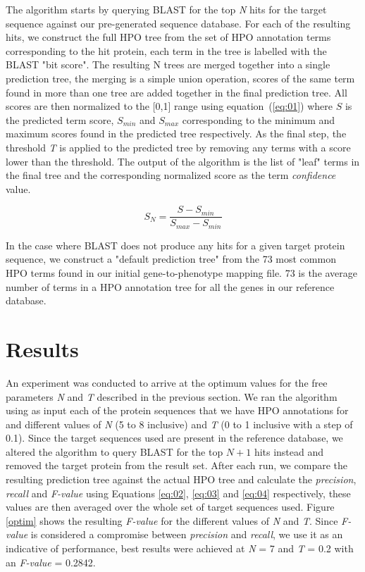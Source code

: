 \documentclass{bioinfo}
\begin{document}
The algorithm starts by querying BLAST for the top \textit{N} hits for the target sequence against our pre-generated sequence database. For each of the resulting hits, we construct the full HPO tree from the set of HPO annotation terms corresponding to the hit protein, each term in the tree is labelled with the BLAST "bit score". The resulting N trees are merged together into a single prediction tree, the merging is a simple union operation, scores of the same term found in more than one tree are added together in the final prediction tree. All scores are then normalized to the [0,1] range using equation~(\ref{eq:01}) where $S$ is the predicted term score, $S_{min}$ and $S_{max}$ corresponding to the minimum and maximum scores found in the predicted tree respectively. As the final step, the threshold \textit{T} is applied to the predicted tree by removing any terms with a score lower than the threshold. The output of the algorithm is the list of "leaf" terms in the final tree and the corresponding normalized score as the term \textit{confidence} value.

\begin{equation}
S_N = \frac{S - S_{min}}{S_{max} - S_{min}}
\label{eq:01}
\end{equation}

In the case where BLAST does not produce any hits for a given target protein sequence, we construct a "default prediction tree" from the 73 most common HPO terms found in our initial gene-to-phenotype mapping file. 73 is the average number of terms in a HPO annotation tree for all the genes in our reference database.

\section{Results}

An experiment was conducted to arrive at the optimum values for the free parameters \textit{N} and \textit{T} described in the previous section. We ran the algorithm using as input each of the protein sequences that we have HPO annotations for and different values of \textit{N} (5 to 8 inclusive) and \textit{T} (0 to 1 inclusive with a step of 0.1). Since the target sequences used are present in the reference database, we altered the algorithm to query BLAST for the top $N + 1$ hits instead and removed the target protein from the result set. After each run, we compare the resulting prediction tree against the actual HPO tree and calculate the \textit{precision}, \textit{recall} and \textit{F-value} using Equations \ref{eq:02}, \ref{eq:03} and \ref{eq:04} respectively, these values are then averaged over the whole set of target sequences used. Figure \ref{optim} shows the resulting \textit{F-value} for the different values of \textit{N} and \textit{T}. Since \textit{F-value} is considered a compromise between \textit{precision} and \textit{recall}, we use it as an indicative of performance, best results were achieved at \textit{N} = 7 and \textit{T} = 0.2 with an \textit{F-value} = 0.2842.
\end{document}
